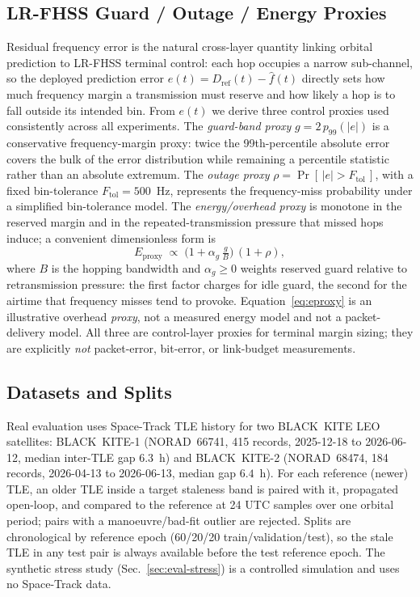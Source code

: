 \documentclass[conference]{IEEEtran}
\begin{document}
\subsection{LR-FHSS Guard / Outage / Energy Proxies}
\label{sec:proxies}
Residual frequency error is the natural cross-layer quantity linking orbital
prediction to LR-FHSS terminal control: each hop occupies a narrow sub-channel,
so the deployed prediction error $e(t)=D_{\mathrm{ref}}(t)-\hat f(t)$ directly
sets how much frequency margin a transmission must reserve and how likely a hop is
to fall outside its intended bin. From $e(t)$ we derive three control proxies used
consistently across all experiments. The \emph{guard-band proxy}
$g = 2\,p_{99}(|e|)$ is a conservative frequency-margin proxy: twice the
99th-percentile absolute error covers the bulk of the error distribution while
remaining a percentile statistic rather than an absolute extremum. The
\emph{outage proxy} $\rho = \Pr[\,|e| > F_{\mathrm{tol}}\,]$, with a fixed
bin-tolerance $F_{\mathrm{tol}}=500$~Hz, represents the frequency-miss probability
under a simplified bin-tolerance model. The \emph{energy/overhead proxy} is
monotone in the reserved margin and in the repeated-transmission pressure that
missed hops induce; a convenient dimensionless form is
\begin{equation}
E_{\mathrm{proxy}} \;\propto\; \Big(1 + \alpha_g\,\tfrac{g}{B}\Big)\,(1 + \rho),
\label{eq:eproxy}
\end{equation}
where $B$ is the hopping bandwidth and $\alpha_g\!\ge\!0$ weights reserved guard
relative to retransmission pressure: the first factor charges for idle guard, the
second for the airtime that frequency misses tend to provoke. Equation~\eqref{eq:eproxy}
is an illustrative overhead \emph{proxy}, not a measured energy model and not a
packet-delivery model. All three are control-layer proxies for terminal margin
sizing; they are explicitly \emph{not} packet-error, bit-error, or link-budget
measurements.

\subsection{Datasets and Splits}
\label{sec:data}
Real evaluation uses Space-Track TLE history for two BLACK~KITE LEO satellites:
BLACK~KITE-1 (NORAD~66741, 415 records, 2025-12-18 to 2026-06-12, median
inter-TLE gap $6.3$~h) and BLACK~KITE-2 (NORAD~68474, 184 records, 2026-04-13 to
2026-06-13, median gap $6.4$~h). For each reference (newer) TLE, an older TLE
inside a target staleness band is paired with it, propagated open-loop, and
compared to the reference at 24 UTC samples over one orbital period; pairs with a
manoeuvre/bad-fit outlier are rejected. Splits are chronological by reference
epoch (60/20/20 train/validation/test), so the stale TLE in any test pair is
always available before the test reference epoch. The synthetic stress study
(Sec.~\ref{sec:eval-stress}) is a controlled simulation and uses no Space-Track
data.
\end{document}
